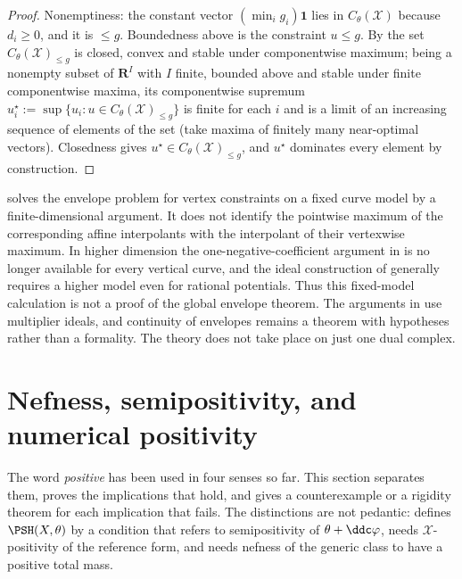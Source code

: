 \begin{proof}
Nonemptiness: the constant vector \((\min_ig_i)\mathbf 1\) lies in
\(C_\theta(\mathcal X)\) because \(d_i\geq0\), and it is \(\leq g\).
Boundedness above is the constraint \(u\leq g\).  By
 the set \(C_\theta(\mathcal X)_{\le g}\) is
closed, convex and stable under componentwise maximum; being a nonempty
subset of \(\mathbf R^I\) with \(I\) finite, bounded above and stable under
finite componentwise maxima, its componentwise supremum
\(u^\star_i:=\sup\{u_i:u\in C_\theta(\mathcal X)_{\le g}\}\) is finite for
each \(i\) and is a limit of an increasing sequence of elements of the set
(take maxima of finitely many near-optimal vectors).  Closedness gives
\(u^\star\in C_\theta(\mathcal X)_{\le g}\), and \(u^\star\) dominates every
element by construction.
\end{proof}

\begin{remark}
\label{rem:ch20-fixed-model-envelope-scope}
 solves the envelope problem for vertex
constraints on a fixed curve model by a finite-dimensional argument.
It does not identify the pointwise maximum of the corresponding affine
interpolants with the interpolant of their vertexwise maximum.
In higher dimension the one-negative-coefficient argument in
 is no longer available for every vertical
curve, and the ideal construction of  generally
requires a higher model even for rational potentials.  Thus this
fixed-model calculation is not a proof of the global envelope theorem.
The arguments in
 use multiplier ideals, and continuity of envelopes
remains a theorem with hypotheses rather than a formality.  The theory
does not take place on just one dual complex.
\end{remark}

\section{Nefness, semipositivity, and numerical positivity}
\label{sec:ch20-positivity}

The word \emph{positive} has been used in four senses so far.  This section
separates them, proves the implications that hold, and gives a
counterexample or a rigidity theorem for each implication that fails.  The
distinctions are not pedantic:  defines
\(\PSH(X,\theta)\) by a condition that refers to semipositivity of
\(\theta+\ddc\varphi\),  needs
\(\mathcal X\)-positivity of the reference form, and
 needs nefness of the generic class to have a positive
total mass.

